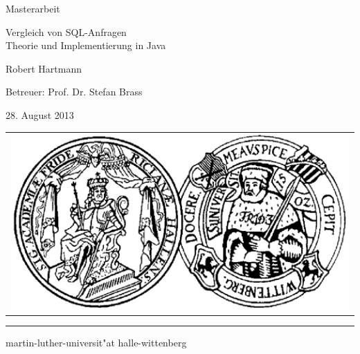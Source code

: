\pagestyle{empty}

\begin{center}

{\Large\sc Masterarbeit}

\vspace{1.25cm}

{\fontsize{22}{22}\selectfont Vergleich von SQL-Anfragen\\Theorie und Implementierung in Java}

\vspace{1.25cm}

{\Large\sc

Robert Hartmann

\vspace{.15cm}

Betreuer: Prof. Dr. Stefan Brass

\vspace{.15cm}

28. August 2013

}

\vspace{10.5cm}

\begin{tabular}{c}
	\includegraphics[height=15ex]{Bilder/siegel}
\end{tabular}

\vspace{0.5cm}

\rule{.7\textwidth}{.40pt}

\vspace{.2cm}

{\large\sc

martin-luther-universit"at halle-wittenberg

}

\end{center}

\cleardoublepage

